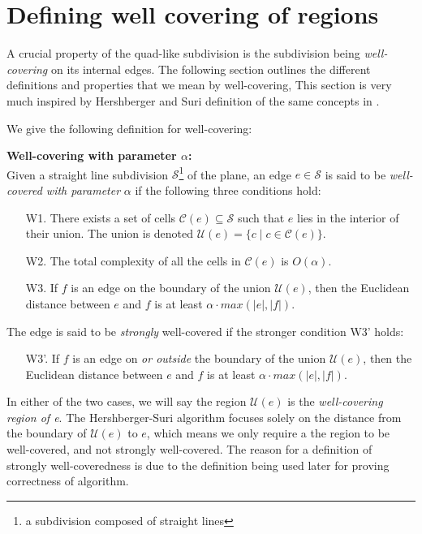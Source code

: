 \section{Defining well covering of regions}\label{section:def-well-covering-if-regions}

A crucial property of the quad-like subdivision is the subdivision being \textit{well-
covering} on its internal edges. The following section outlines the different definitions 
and properties that we mean by well-covering, This section is very much inspired by 
Hershberger and Suri definition of the same concepts in \cite{HershbergerS99}. 

We give the following definition for well-covering:

\begin{mydef}
	\label{def:wellcoveringwithpara}
	\textbf{Well-covering with parameter $\alpha$:}\\
	Given a straight line subdivision $\mathcal{S}$\footnote{a subdivision composed of straight lines} 
	of the plane, an edge $e\in\mathcal{S}$ is said to be \textit{well-covered with parameter}
	$\alpha$ if the following three conditions hold:
	\begin{enumerate}
    \setlength\itemsep{1em}
		\item[W1.] There exists a set of cells $\mathcal{C}(e)\subseteq\mathcal{S}$ such
				   that $e$ lies in the interior of their union. The union is denoted
				   $\mathcal{U}(e)=\{c \mid c \in \mathcal{C}(e)\}$.
		\item[W2.] The total complexity of all the cells in $\mathcal{C}(e)$ is 
        		   $O(\alpha)$.
		\item[W3.] If $f$ is an edge on the boundary of the union $\mathcal{U}(e)$, then
        		   the Euclidean distance between $e$ and $f$ is at least $\alpha\cdot
				   max(|e|,|f|)$. 
	\end{enumerate}
	The edge is said to be \textit{strongly} well-covered if the stronger
	condition W3' holds:
	\begin{enumerate}
    \setlength\itemsep{1em}
		\item[W3'.] If $f$ is an edge on \textit{or outside} the boundary of the
					union $\mathcal{U}(e)$, then the Euclidean distance between $e$ and
					$f$ is at least $\alpha\cdot max(|e|,|f|)$.
	\end{enumerate}
\end{mydef}

In either of the two cases, we will say the region $\mathcal{U}(e)$ is the 
\textit{well-covering region of e}. The Hershberger-Suri algorithm 
focuses solely on the distance from the boundary of $\mathcal{U}(e)$ to $e$, which means 
we only require a the region to be well-covered, and not strongly well-covered. The 
reason for a definition of strongly well-coveredness is due to the definition being 
used later for proving correctness of algorithm.


